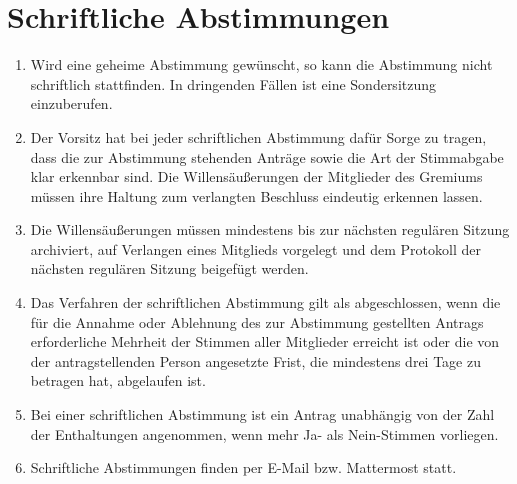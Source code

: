 \section{Schriftliche Abstimmungen}
\label{sec:schriftlich}
\begin{enumerate}
	\item Wird eine geheime Abstimmung gewünscht, so kann die Abstimmung nicht schriftlich stattfinden.
	In dringenden Fällen ist eine Sondersitzung einzuberufen.
	\item Der Vorsitz hat bei jeder schriftlichen Abstimmung dafür Sorge zu tragen, dass die zur Abstimmung stehenden Anträge sowie die Art der Stimmabgabe klar erkennbar sind.
	Die Willensäußerungen der Mitglieder des Gremiums müssen ihre Haltung zum verlangten Beschluss eindeutig erkennen lassen.
	\item Die Willensäußerungen müssen mindestens bis zur nächsten regulären Sitzung archiviert, auf Verlangen eines Mitglieds vorgelegt und dem Protokoll der nächsten regulären Sitzung beigefügt werden.
	\item Das Verfahren
	der schriftlichen Abstimmung gilt als abgeschlossen, wenn die für die Annahme oder
	Ablehnung des zur Abstimmung gestellten Antrags erforderliche Mehrheit der Stimmen
	aller Mitglieder erreicht ist oder die von der antragstellenden Person angesetzte Frist, die
	mindestens drei Tage zu betragen hat, abgelaufen ist.
	\item Bei einer schriftlichen Abstimmung ist ein Antrag unabhängig von der Zahl der Enthaltungen angenommen, wenn mehr Ja- als Nein-Stimmen vorliegen.
	\item Schriftliche Abstimmungen finden per E-Mail bzw. Mattermost statt.
\end{enumerate}

